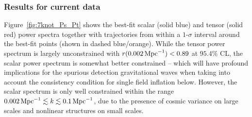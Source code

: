\documentclass[a4paper,11pt]{article}
\def\mpc{{\rm\,Mpc}}
\def\mpc{{\rm\,Mpc}}
\def\goodkrange{0.002\mpc^{-1}\lesssim k\lesssim 0.1\mpc^{-1}}
\begin{document}
\subsubsection{Results for current data}
Figure~\ref{fig:7knot_Ps_Pt} shows the best-fit scalar (solid blue)
and tensor (solid red) power spectra together with trajectories from
within a $1$-$\sigma$ interval around the best-fit points (shown in
dashed blue/orange). While the tensor power spectrum is largely
unconstrained with $r(0.002\mpc^{-1})<0.89$ at $95.4\%$ CL, the scalar
power spectrum is somewhat better constrained -- which will have
profound implications for the spurious detection gravitational waves
when taking into account the consistency condition for single field
inflation below. However, the scalar spectrum is only well constrained
within the range $\goodkrange$, due to the presence of cosmic variance
on large scales and nonlinear structures on small scales. 
\end{document}

